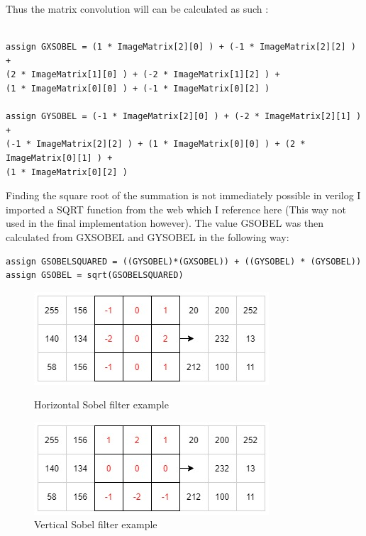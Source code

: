 \documentclass[10pt,twoside]{article}
\begin{document}
Thus the matrix convolution will can be calculated as such :
\begin{verbatim}

assign GXSOBEL = (1 * ImageMatrix[2][0] ) + (-1 * ImageMatrix[2][2] ) + 
(2 * ImageMatrix[1][0] ) + (-2 * ImageMatrix[1][2] ) + 
(1 * ImageMatrix[0][0] ) + (-1 * ImageMatrix[0][2] )

assign GYSOBEL = (-1 * ImageMatrix[2][0] ) + (-2 * ImageMatrix[2][1] ) + 
(-1 * ImageMatrix[2][2] ) + (1 * ImageMatrix[0][0] ) + (2 * ImageMatrix[0][1] ) + 
(1 * ImageMatrix[0][2] )

\end{verbatim}
Finding the square root of the summation is not immediately possible in verilog I imported a SQRT function from the web which I reference here \cite{VerilogROOT} (This way not used in the final implementation however). The value GSOBEL was then calculated from GXSOBEL and GYSOBEL in the following way: 
\begin{verbatim}
assign GSOBELSQUARED = ((GYSOBEL)*(GXSOBEL)) + ((GYSOBEL) * (GYSOBEL)) 
assign GSOBEL = sqrt(GSOBELSQUARED)
\end{verbatim}

\begin{figure}[!htb]
\begin{minipage}{.49\textwidth}
        \includegraphics[scale = 0.55]{GX.jpg}
        \centering
        \caption{Horizontal Sobel filter example}
        \label{fig:InitalDesign}
\end{minipage}
\begin{minipage}{.49\textwidth}
        \includegraphics[scale = 0.55]{GY.jpg}
        \centering
        \caption{Vertical Sobel filter example}
        \label{fig:InitalDesign}
\end{minipage}
\end{figure}
\end{document}
